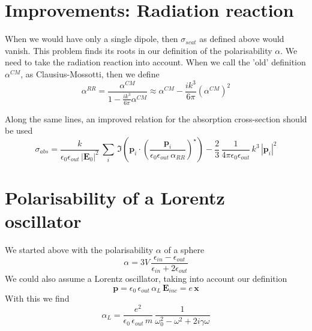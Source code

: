  
\section{Improvements: Radiation reaction} 

When we would have only a single dipole, then $\sigma_{scat}$ as defined above would vanish. This problem finds its roots in our definition of the polarisability $\alpha$. We need to take the radiation reaction into account. When we call the 'old' definition $\alpha^{CM}$, as Clausius-Mossotti, then we define 
\begin{equation}
\alpha^{RR} = \frac{\alpha^{CM}}{1 - \frac{i k^3}{6 \pi} \alpha^{CM}}
\approx
\alpha^{CM} -  \frac{i k^3}{6 \pi} \left(\alpha^{CM}\right)^2
\end{equation}

Along the same lines, an improved relation for the absorption cross-section should be used
 \begin{equation}
\sigma_{abs} = \frac{k}{\epsilon_0 \epsilon_{out}  \, |\mathbf{E}_{0}|^2} \, \sum_i \, \Im \left( \mathbf{p}_i \cdot \left( \frac{\mathbf{p}_i}{\epsilon_0 \epsilon_{out}  \, \alpha_{RR}} \right) ^\star \right) 
- \frac{2}{3} \, \frac{1}{4 \pi \epsilon_0 \epsilon_{out}} \,  k^3 \, |  \mathbf{p}_i |^2
\end{equation}


\section{Polarisability of  a Lorentz oscillator}

We started above with the polarisability $\alpha$ of a sphere
\begin{equation}
 \alpha = 3V \, \frac{\epsilon_{in} - \epsilon_{out}}{\epsilon_{in} + 2 \epsilon_{out}}
\end{equation}
We could also assume a Lorentz oscillator, taking into account our definition 
 \begin{equation}
\mathbf{p} = \epsilon_0 \, \epsilon_{out} \, \alpha_L \, \mathbf{E}_{inc} = e \, \mathbf{x}
\end{equation}
With this we find 
 \begin{equation}
 \alpha_L = \frac{e^2 }{ \epsilon_0 \, \epsilon_{out}  \, m} \,  \frac{1}{\omega_0^2 - \omega^2 +2  i \gamma \omega } 
\end{equation}

